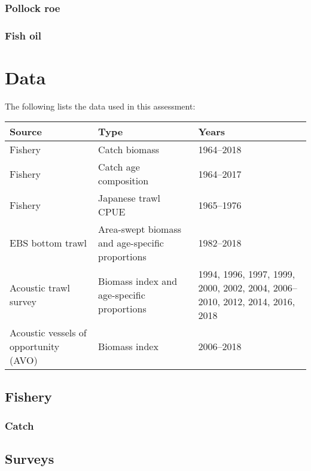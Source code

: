 \documentclass[11pt,]{article}
\begin{document}
\hypertarget{pollock-roe}{%
\subsubsection{Pollock roe}\label{pollock-roe}}

\hypertarget{fish-oil}{%
\subsubsection{Fish oil}\label{fish-oil}}

\hypertarget{data}{%
\section{Data}\label{data}}

The following lists the data used in this assessment:

\begin{table}[ht]
\centering
\label{tab:dataextent}
\begin{tabular}{p{1.5in}p{1.8in}p{2.8in}}
\hline
 Source & Type & Years \\
\hline
 Fishery & Catch biomass & 1964--2018 \\
 Fishery & Catch age composition & 1964--2017 \\
 Fishery & Japanese trawl CPUE & 1965--1976 \\
 EBS bottom trawl & Area-swept biomass and age-specific proportions & 1982--2018 \\
 Acoustic trawl survey & Biomass index and age-specific proportions & 1994, 1996, 1997, 1999, 2000, 2002, 2004, 2006--2010, 2012, 2014, 2016, 2018 \\
 Acoustic vessels of opportunity (AVO) & Biomass index & 2006--2018 \\
\hline
\end{tabular}
\end{table}

\hypertarget{fishery-1}{%
\subsection{Fishery}\label{fishery-1}}

\hypertarget{catch}{%
\subsubsection{Catch}\label{catch}}

\hypertarget{surveys}{%
\subsection{Surveys}\label{surveys}}
\end{document}
